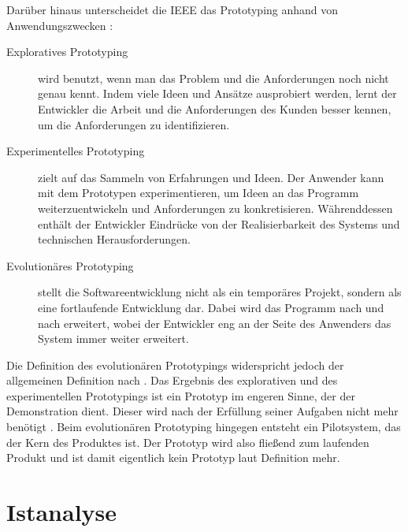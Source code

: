 \documentclass [12pt, a4paper, oneside, titlepage, ngerman]{article}
\begin{document}
\noindent Darüber hinaus unterscheidet die IEEE %
 das Prototyping anhand von Anwendungszwecken \cite[vgl.][S.826]{ieeeprot}: 
\begin{description}
\item[Exploratives Prototyping] wird benutzt, wenn man das Problem und die Anforderungen noch nicht genau kennt. Indem viele Ideen und Ansätze ausprobiert werden, lernt der Entwickler die Arbeit und die Anforderungen des Kunden besser kennen, um die Anforderungen zu identifizieren.
\item[Experimentelles Prototyping] zielt auf das Sammeln von Erfahrungen und Ideen. Der Anwender kann mit dem Prototypen experimentieren, um Ideen an das Programm weiterzuentwickeln und Anforderungen zu konkretisieren. Währenddessen enthält der Entwickler Eindrücke von der Realisierbarkeit des Systems und technischen Herausforderungen.
\item[Evolutionäres Prototyping] stellt die Softwareentwicklung nicht als ein temporäres Projekt, sondern als eine fortlaufende Entwicklung dar. Dabei wird das Programm nach und nach erweitert, wobei der Entwickler eng an der Seite des Anwenders das System immer weiter erweitert.
\end{description}
Die Definition des evolutionären Prototypings widerspricht jedoch der allgemeinen Definition nach \cite{gabler}. Das Ergebnis des explorativen und des experimentellen Prototypings ist ein Prototyp im engeren Sinne, der der Demonstration dient. Dieser wird nach der Erfüllung seiner Aufgaben nicht mehr benötigt \cite[vgl.][S.21]{liggesmeyer2012}. Beim evolutionären Prototyping hingegen entsteht ein Pilotsystem, das der Kern des Produktes ist. Der Prototyp wird also fließend zum laufenden Produkt \cite[vgl.][S.24]{liggesmeyer2012} und ist damit eigentlich kein Prototyp laut Definition mehr.

\newpage

\section {Istanalyse}
\end{document}
